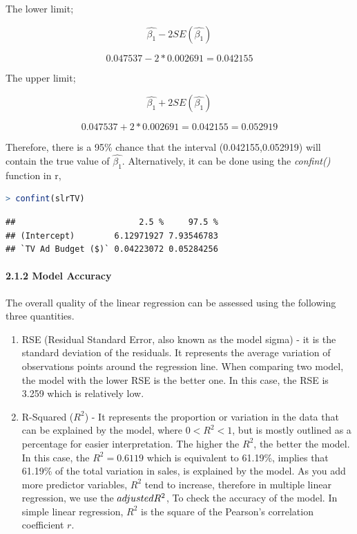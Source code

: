 \documentclass[
]{article}
\begin{document}
The lower limit;

\[\hat{\beta_1}-2SE(\hat{\beta_1})\]

\[0.047537-2* 0.002691=0.042155\]

The upper limit;

\[\hat{\beta_1}+2SE(\hat{\beta_1})\]

\[0.047537+2* 0.002691=0.042155=0.052919\]

Therefore, there is a 95\% chance that the interval (0.042155,0.052919)
will contain the true value of \(\hat{\beta_1}\). Alternatively, it can
be done using the \emph{confint()} function in r,

\begin{lstlisting}[language=R]
> confint(slrTV)
\end{lstlisting}

\begin{lstlisting}
##                         2.5 %     97.5 %
## (Intercept)        6.12971927 7.93546783
## `TV Ad Budget ($)` 0.04223072 0.05284256
\end{lstlisting}

\hypertarget{model-accuracy}{%
\paragraph{2.1.2 Model Accuracy}\label{model-accuracy}}

The overall quality of the linear regression can be assessed using the
following three quantities.

\begin{enumerate}
\def\labelenumi{\arabic{enumi}.}
\item
  RSE (Residual Standard Error, also known as the model sigma) - it is
  the standard deviation of the residuals. It represents the average
  variation of observations points around the regression line. When
  comparing two model, the model with the lower RSE is the better one.
  In this case, the RSE is 3.259 which is relatively low.
\item
  R-Squared (\(R^2\)) - It represents the proportion or variation in the
  data that can be explained by the model, where \(0<R^2<1\), but is
  mostly outlined as a percentage for easier interpretation. The higher
  the \(R^2\), the better the model. In this case, the \(R^2= 0.6119\)
  which is equivalent to 61.19\%, implies that 61.19\% of the total
  variation in sales, is explained by the model. As you add more
  predictor variables, \(R^2\) tend to increase, therefore in multiple
  linear regression, we use the \(adjusted\space R^2\), To check the
  accuracy of the model. In simple linear regression, \(R^2\) is the
  square of the Pearson's correlation coefficient \(r\).
\end{enumerate}
\end{document}
